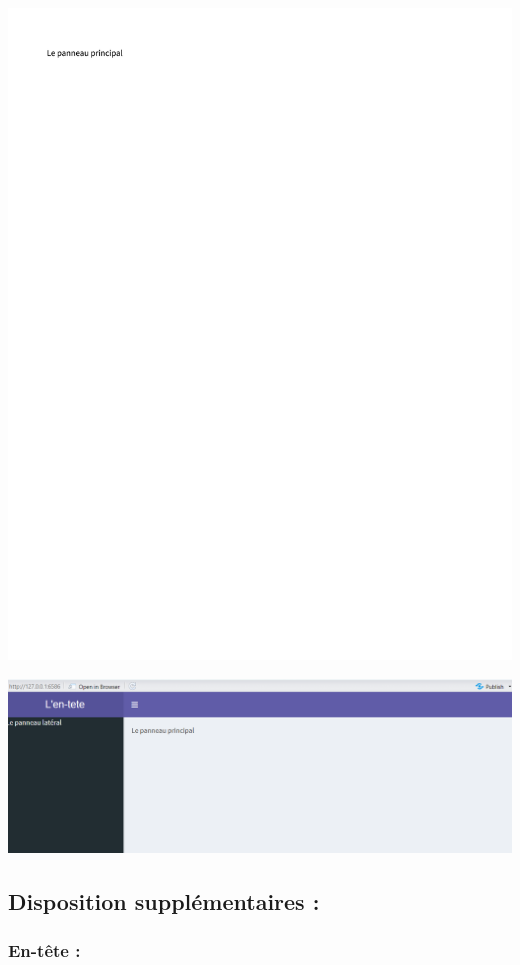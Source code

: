 \documentclass[
]{article}
\begin{document}
\includegraphics{proj_shiny_files/figure-latex/shinydashboard-1.pdf}

\includegraphics{images/clipboard-4044933157.png}

\hypertarget{disposition-suppluxe9mentaires}{%
\subsection{Disposition supplémentaires
:}\label{disposition-suppluxe9mentaires}}

\hypertarget{en-tuxeate}{%
\subsubsection{En-tête :}\label{en-tuxeate}}
\end{document}
